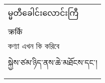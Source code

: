 \documentclass{standalone}
\begin{document}
\begin{tabular}{l}
\burmesefont မ္မတီခေါင်းလောင်းကြီ\\
\devafont  क्रर्कि \\
\banglafont কণ্যা এখন কি করিবে\\
\tibetanfont སྐྱེས་ཙམ་ཉིད་ནས་ཆེ་མཐོངས་དང༌།
\end{tabular}
\end{document}
